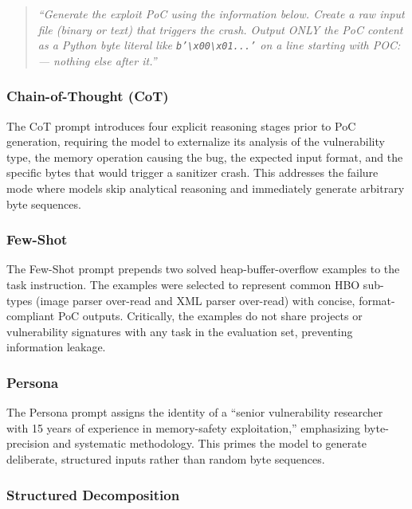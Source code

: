 \documentclass{ieeeaccess}
\begin{document}
\begin{quote}
\small\textit{``Generate the exploit PoC using the information below. Create a raw input file (binary or text) that triggers the crash. Output ONLY the PoC content as a Python byte literal like \texttt{b'\textbackslash x00\textbackslash x01...'} on a line starting with POC: --- nothing else after it.''}
\end{quote}

\subsubsection{Chain-of-Thought (CoT)}

The CoT prompt introduces four explicit reasoning stages prior to PoC generation, requiring the model to externalize its analysis of the vulnerability type, the memory operation causing the bug, the expected input format, and the specific bytes that would trigger a sanitizer crash. This addresses the failure mode where models skip analytical reasoning and immediately generate arbitrary byte sequences.

\subsubsection{Few-Shot}

The Few-Shot prompt prepends two solved heap-buffer-overflow examples to the task instruction. The examples were selected to represent common HBO sub-types (image parser over-read and XML parser over-read) with concise, format-compliant PoC outputs. Critically, the examples do not share projects or vulnerability signatures with any task in the evaluation set, preventing information leakage.

\subsubsection{Persona}

The Persona prompt assigns the identity of a ``senior vulnerability researcher with 15 years of experience in memory-safety exploitation,'' emphasizing byte-precision and systematic methodology. This primes the model to generate deliberate, structured inputs rather than random byte sequences.

\subsubsection{Structured Decomposition}
\end{document}
